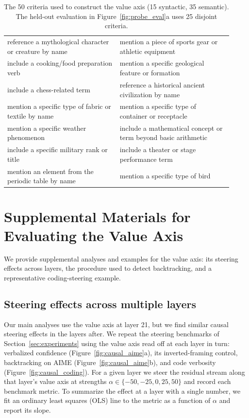 \documentclass{article}
\begin{document}
\begin{table}[h]
\begin{tabular}{p{0.46\linewidth} p{0.46\linewidth}}
reference a mythological character or creature by name & mention a piece of sports gear or athletic equipment \\
include a cooking/food preparation verb & mention a specific geological feature or formation \\
include a chess-related term & reference a historical ancient civilization by name \\
mention a specific type of fabric or textile by name & mention a specific type of container or receptacle \\
mention a specific weather phenomenon & include a mathematical concept or term beyond basic arithmetic \\
include a specific military rank or title & include a theater or stage performance term \\
mention an element from the periodic table by name & mention a specific type of bird \\
\bottomrule
\end{tabular}
\caption{The 50 criteria used to construct the value axis (15 syntactic, 35 semantic). The held-out evaluation in Figure~\ref{fig:probe_eval}a uses 25 disjoint criteria.}
\label{tab:criteria}
\end{table}


\section{Supplemental Materials for Evaluating the Value Axis}
\label{app:eval_supp}

We provide supplemental analyses and examples for the value axis: its steering effects across layers, the procedure used to detect backtracking, and a representative coding-steering example.

\subsection{Steering effects across multiple layers}
\label{app:alternative_probes}

Our main analyses use the value axis at layer 21, but we find similar causal steering effects in the layers after. We repeat the steering benchmarks of Section~\ref{sec:experiments} using the value axis read off at each layer in turn: verbalized confidence (Figure~\ref{fig:causal_aime}a), its inverted-framing control, backtracking on AIME (Figure~\ref{fig:causal_aime}b), and code verbosity (Figure~\ref{fig:causal_coding}). For a given layer we steer the residual stream along that layer's value axis at strengths $\alpha \in \{-50, -25, 0, 25, 50\}$ and record each benchmark metric. To summarize the effect at a layer with a single number, we fit an ordinary least squares (OLS) line to the metric as a function of $\alpha$ and report its slope.
\end{document}
